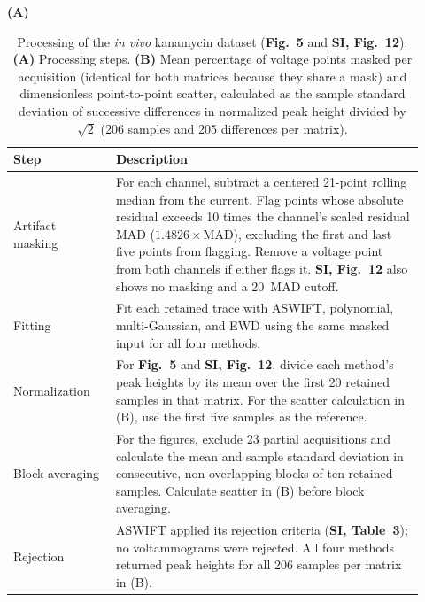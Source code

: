 \clearpage
\begin{table}[H]
  \centering
  \captionsetup{labelformat=revfig, labelsep=revspace}
  \caption[Processing of the \textsl{in vivo} kanamycin dataset]{Processing of the \textsl{in vivo} kanamycin dataset (\textbf{Fig.~5} and \textbf{SI, Fig.~12}). \textbf{(A)} Processing steps. \textbf{(B)} Mean percentage of voltage points masked per acquisition (identical for both matrices because they share a mask) and dimensionless point-to-point scatter, calculated as the sample standard deviation of successive differences in normalized peak height divided by $\sqrt{2}$ (206 samples and 205 differences per matrix).}
  \label{tab:s4}
  \small
  \renewcommand{\arraystretch}{1.2}
  \textbf{(A)}\par\smallskip
  \begin{tabular}{L{0.23\linewidth} L{0.69\linewidth}}
    \hline
    Step & Description \\
    \hline
    Artifact masking & For each channel, subtract a centered 21-point rolling median from the current. Flag points whose absolute residual exceeds 10 times the channel's scaled residual MAD ($1.4826\times\mathrm{MAD}$), excluding the first and last five points from flagging. Remove a voltage point from both channels if either flags it. \textbf{SI, Fig.~12} also shows no masking and a 20~MAD cutoff. \\
    Fitting & Fit each retained trace with ASWIFT, polynomial, multi-Gaussian, and EWD using the same masked input for all four methods. \\
    Normalization & For \textbf{Fig.~5} and \textbf{SI, Fig.~12}, divide each method's peak heights by its mean over the first 20 retained samples in that matrix. For the scatter calculation in (B), use the first five samples as the reference. \\
    Block averaging & For the figures, exclude 23 partial acquisitions and calculate the mean and sample standard deviation in consecutive, non-overlapping blocks of ten retained samples. Calculate scatter in (B) before block averaging. \\
    Rejection & ASWIFT applied its rejection criteria (\textbf{SI, Table~3}); no voltammograms were rejected. All four methods returned peak heights for all 206 samples per matrix in (B). \\
    \hline
  \end{tabular}


\end{table}
